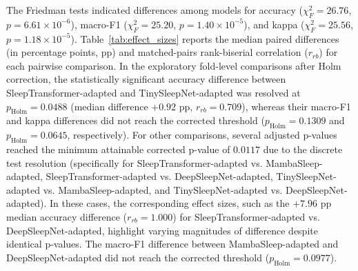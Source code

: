 \documentclass[conference]{IEEEtran}
\begin{document}
The Friedman tests indicated differences among models for accuracy ($\chi^2_F=26.76$, $p=6.61\times10^{-6}$), macro-F1 ($\chi^2_F=25.20$, $p=1.40\times10^{-5}$), and kappa ($\chi^2_F=25.56$, $p=1.18\times10^{-5}$). Table~\ref{tab:effect_sizes} reports the median paired differences (in percentage points, pp) and matched-pairs rank-biserial correlation ($r_{rb}$) for each pairwise comparison. In the exploratory fold-level comparisons after Holm correction, the statistically significant accuracy difference between SleepTransformer-adapted and TinySleepNet-adapted was resolved at $p_{\mathrm{Holm}}=0.0488$ (median difference $+0.92$ pp, $r_{rb}=0.709$), whereas their macro-F1 and kappa differences did not reach the corrected threshold ($p_{\mathrm{Holm}}=0.1309$ and $p_{\mathrm{Holm}}=0.0645$, respectively). For other comparisons, several adjusted p-values reached the minimum attainable corrected p-value of $0.0117$ due to the discrete test resolution (specifically for SleepTransformer-adapted vs. MambaSleep-adapted, SleepTransformer-adapted vs. DeepSleepNet-adapted, TinySleepNet-adapted vs. MambaSleep-adapted, and TinySleepNet-adapted vs. DeepSleepNet-adapted). In these cases, the corresponding effect sizes, such as the $+7.96$ pp median accuracy difference ($r_{rb}=1.000$) for SleepTransformer-adapted vs. DeepSleepNet-adapted, highlight varying magnitudes of difference despite identical p-values. The macro-F1 difference between MambaSleep-adapted and DeepSleepNet-adapted did not reach the corrected threshold ($p_{\mathrm{Holm}}=0.0977$).
\end{document}
